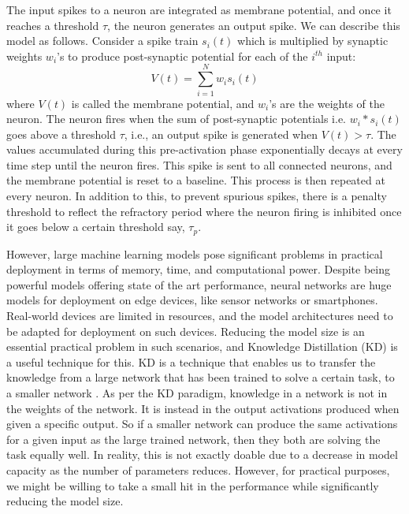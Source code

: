 \documentclass{article}
\begin{document}
The input spikes to a neuron are integrated as membrane potential, and once it reaches a threshold $\tau$, the neuron generates an output spike. We can describe this model as follows. Consider a spike train $s_i(t)$ which is multiplied by synaptic weights $w_i$'s to produce post-synaptic potential for each of the $i^{th}$ input:
\begin{equation}
    V(t) = \sum_{i=1}^{N} w_i s_i(t)
\end{equation}
where $V(t)$ is called the membrane potential, and $w_i$'s are the weights of the neuron. The neuron fires when the sum of post-synaptic potentials i.e. $w_i * s_i(t)$ goes above a threshold $\tau$, i.e., an output spike is generated when $V(t) > \tau$. The values accumulated during this pre-activation phase exponentially decays at every time step until the neuron fires. This spike is sent to all connected neurons, and the membrane potential is reset to a baseline. This process is then repeated at every neuron. In addition to this, to prevent spurious spikes, there is a penalty threshold to reflect the refractory period where the neuron firing is inhibited once it goes below a certain threshold say, $\tau_p$.

However, large machine learning models pose significant problems in practical deployment in terms of memory, time, and computational power. Despite being powerful models offering state of the art performance, neural networks are huge models for deployment on edge devices, like sensor networks or smartphones. Real-world devices are limited in resources, and the model architectures need to be adapted for deployment on such devices. Reducing the model size is an essential practical problem in such scenarios, and Knowledge Distillation (KD) is a useful technique for this. KD is a technique that enables us to transfer the knowledge from a large network that has been trained to solve a certain task, to a smaller network \cite{hinton2015distilling}. As per the KD paradigm, knowledge in a network is not in the weights of the network. It is instead in the output activations produced when given a specific output. So if a smaller network can produce the same activations for a given input as the large trained network, then they both are solving the task equally well. In reality, this is not exactly doable due to a decrease in model capacity as the number of parameters reduces. However, for practical purposes, we might be willing to take a small hit in the performance while significantly reducing the model size.
\end{document}
